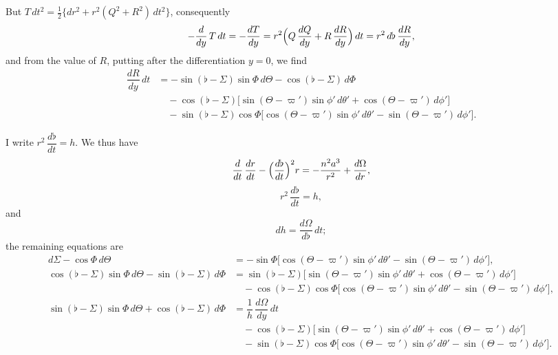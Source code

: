 \documentclass[12pt,a4paper]{article}
\theoremstyle{plain}
\begin{document}
\medskip
But $T\,dt^{2}=\tfrac{1}{2}\bigl\{dr^{2}+r^{2}(Q^{2}+R^{2})\,dt^{2}\bigr\}$, consequently
\[
-\dfrac{d}{dy}\,T\,dt=-\dfrac{dT}{dy}=r^{2}\Bigl(Q\,\dfrac{dQ}{dy}+R\,\dfrac{dR}{dy}\Bigr)\,dt=r^{2}\,d\flat\,\dfrac{dR}{dy},
\]
and from the value of $R$, putting after the differentiation $y=0$, we find
\begin{align*}
\dfrac{dR}{dy}\,dt &= -\sin(\flat-\varSigma)\sin\varPhi\,d\Theta-\cos(\flat-\varSigma)\,d\varPhi\\
&\quad -\cos(\flat-\varSigma)\bigl[\sin(\Theta-\varpi')\sin\phi'\,d\theta'+\cos(\Theta-\varpi')\,d\phi'\bigr]\\
&\quad -\sin(\flat-\varSigma)\cos\varPhi\bigl[\cos(\Theta-\varpi')\sin\phi'\,d\theta'-\sin(\Theta-\varpi')\,d\phi'\bigr].
\end{align*}

\newpage
{} I write $r^{2}\,\dfrac{d\flat}{dt}=h$. We thus have
\[
\dfrac{d}{dt}\,\dfrac{dr}{dt}-\Bigl(\dfrac{d\flat}{dt}\Bigr)^{2}r=-\dfrac{n^{2}a^{3}}{r^{2}}+\dfrac{d\Omega}{dr},
\]
\[
r^{2}\,\dfrac{d\flat}{dt}=h,
\]
and
\[
dh=\dfrac{d\Omega}{d\flat}\,dt;
\]
the remaining equations are
\begin{align*}
d\varSigma-\cos\varPhi\,d\Theta &= -\sin\varPhi\bigl[\cos(\Theta-\varpi')\sin\phi'\,d\theta'-\sin(\Theta-\varpi')\,d\phi'\bigr],\\[0.4em]
\cos(\flat-\varSigma)\sin\varPhi\,d\Theta-\sin(\flat-\varSigma)\,d\varPhi &= \sin(\flat-\varSigma)\bigl[\sin(\Theta-\varpi')\sin\phi'\,d\theta'+\cos(\Theta-\varpi')\,d\phi'\bigr]\\
&\quad -\cos(\flat-\varSigma)\cos\varPhi\bigl[\cos(\Theta-\varpi')\sin\phi'\,d\theta'-\sin(\Theta-\varpi')\,d\phi'\bigr],\\[0.4em]
\sin(\flat-\varSigma)\sin\varPhi\,d\Theta+\cos(\flat-\varSigma)\,d\varPhi &= \dfrac{1}{h}\,\dfrac{d\Omega}{dy}\,dt\\
&\quad -\cos(\flat-\varSigma)\bigl[\sin(\Theta-\varpi')\sin\phi'\,d\theta'+\cos(\Theta-\varpi')\,d\phi'\bigr]\\
&\quad -\sin(\flat-\varSigma)\cos\varPhi\bigl[\cos(\Theta-\varpi')\sin\phi'\,d\theta'-\sin(\Theta-\varpi')\,d\phi'\bigr].
\end{align*}
\end{document}
